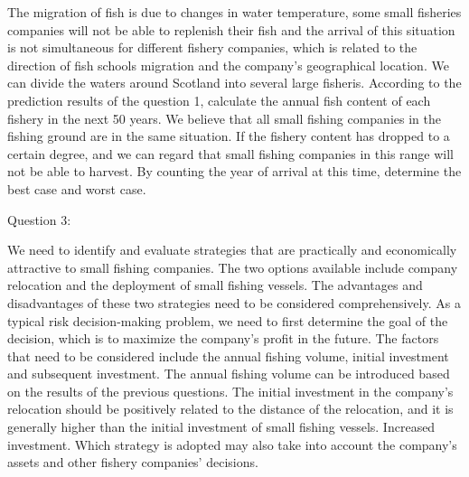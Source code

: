 \documentclass{mcmthesis}
\numberwithin{figure}{section}
\numberwithin{table}{section}
\begin{document}
The migration of fish is due to changes in water temperature, some small fisheries companies will not be able to replenish their fish and the arrival of this situation is not simultaneous for different fishery companies, which is related to the direction of fish schools migration and the company's geographical location. We can divide the waters around Scotland into several large fisheris. According to the prediction results of the question 1, calculate the annual fish content of each fishery in the next 50 years. We believe that all small fishing companies in the fishing ground are in the same situation. If the fishery content has dropped to a certain degree, and we can regard that small fishing companies in this range will not be able to harvest. By counting the year of arrival at this time, determine the best case and worst case.

Question 3: 

We need to identify and evaluate strategies that are practically and economically attractive to small fishing companies. The two options available include company relocation and the deployment of small fishing vessels. The advantages and disadvantages of these two strategies need to be considered comprehensively. As a typical risk decision-making problem, we need to first determine the goal of the decision, which is to maximize the company's profit in the future. The factors that need to be considered include the annual fishing volume, initial investment and subsequent investment. The annual fishing volume can be introduced based on the results of the previous questions. The initial investment in the company's relocation should be positively related to the distance of the relocation, and it is generally higher than the initial investment of small fishing vessels. Increased investment. Which strategy is adopted may also take into account the company's assets and other fishery companies' decisions.
\end{document}
